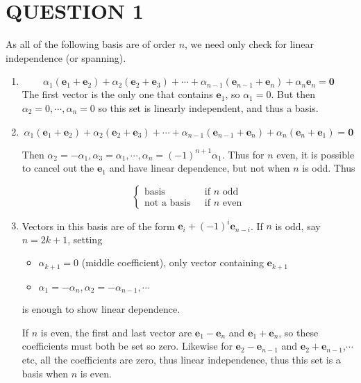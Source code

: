 \documentclass[a4paper]{article}
\begin{document}
	
	\maketitle
	
	\section{QUESTION 1}
	
	As all of the following basis are of order $ n $, we need only check for linear independence (or spanning).
	
	\begin{enumerate}[label = (\alph*)]
		\item  \[ \alpha_{1} (\mathbf{e}_{1} + \mathbf{e}_{2}) + \alpha_{2} (\mathbf{e}_{2} + \mathbf{e}_{3}) + \cdots + \alpha_{n-1} ( \mathbf{e}_{n-1} + \mathbf{e}_{n}) + \alpha_{n} \mathbf{e}_{n} = \mathbf{0}  \]
		The first vector is the only one that contains $ \mathbf{e}_{1} $, so $ \alpha_{1} = 0 $. But then $ \alpha_{2} = 0, \cdots, \alpha_{n} = 0 $ so this set is linearly independent, and thus a basis.
		
		\item \[ \alpha_{1} (\mathbf{e}_{1} + \mathbf{e}_{2}) + \alpha_{2} (\mathbf{e}_{2} + \mathbf{e}_{3}) + \cdots + \alpha_{n-1} ( \mathbf{e}_{n-1} + \mathbf{e}_{n}) + \alpha_{n} (\mathbf{e}_{n} + \mathbf{e}_{1} ) = \mathbf{0}  \]
		
		Then $ \alpha_{2} = - \alpha_{1}, \alpha_{3} = \alpha_{1}, \cdots, \alpha_{n} = (-1)^{n+1}\alpha_{1} $. Thus for $ n $ even, it is possible to cancel out the $ \mathbf{e}_{1} $ and have linear dependence, but not when $ n $ is odd. Thus
		
		\[ \begin{cases} \text{basis }  & \text{ if } n \text{ odd } \\ \text{not a basis } &  \text{ if } n \text{ even} \end{cases} \]
		
		\item Vectors in this basis are of the form $ \mathbf{e}_{i} + (-1)^{i} \mathbf{e}_{n-i} $. If $ n $ is odd, say $ n = 2k + 1 $, setting 
		
		\begin{itemize}
			\item $ \alpha_{k+1} = 0 $ (middle coefficient), only vector containing $ \mathbf{e}_{k+1} $
			\item $ \alpha_{1} = - \alpha_{n}, \alpha_{2} = - \alpha_{n-1}, \cdots $ 
		\end{itemize}
		is enough to show linear dependence.
		
		If $ n $ is even, the first and last vector are $ \mathbf{e}_{1} - \mathbf{e}_{n} $ and $ \mathbf{e}_{1} + \mathbf{e}_{n} $, so these coefficients must both be set so zero. Likewise for $ \mathbf{e}_{2} - \mathbf{e}_{n-1} $ and $ \mathbf{e}_{2} + \mathbf{e}_{n-1} $,$ \cdots $ etc, all the coefficients are zero, thus linear independence, thus this set is a basis when $ n $ is even. 
		
	\end{enumerate}
	
\end{document}
